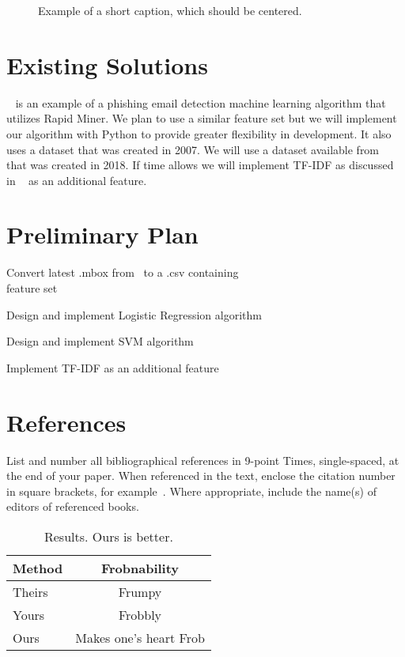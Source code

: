 \documentclass[10pt,twocolumn,letterpaper]{article}
\begin{document}
\begin{figure*}
\begin{center}
\fbox{\rule{0pt}{2in} \rule{.9\linewidth}{0pt}}
\end{center}
   \caption{Example of a short caption, which should be centered.}
\label{fig:short}
\end{figure*}

\section{Existing Solutions}

~\cite{diego} is an example of a phishing email detection machine learning algorithm that utilizes Rapid Miner. We plan to use a similar feature set but we will implement our algorithm with Python to provide greater flexibility in development. It also uses a dataset that was created in 2007. We will use a dataset available from ~\cite{monkey} that was created in 2018. If time allows we will implement TF-IDF as discussed in ~\cite{CENreport} as an additional feature.


\section{Preliminary Plan}

\begin{description}
\item Convert latest .mbox from~\cite{monkey} to a .csv containing \\feature set
\item Design and implement Logistic Regression algorithm
\item Design and implement SVM algorithm    
\item Implement TF-IDF as an additional feature
\end{description}

\section{References}

List and number all bibliographical references in 9-point Times,
single-spaced, at the end of your paper. When referenced in the text,
enclose the citation number in square brackets, for
example~\cite{CENreport}.  Where appropriate, include the name(s) of
editors of referenced books.

\begin{table}
\begin{center}
\begin{tabular}{|l|c|}
\hline
Method & Frobnability \\
\hline\hline
Theirs & Frumpy \\
Yours & Frobbly \\
Ours & Makes one's heart Frob\\
\hline
\end{tabular}
\end{center}
\caption{Results.   Ours is better.}
\end{table}


{\small


}
\end{document}
